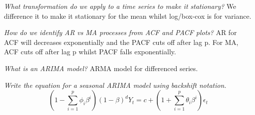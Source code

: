 \documentclass[11pt, oneside]{article}
\theoremstyle{definition}
\begin{document}
\textit{What transformation do we apply to a time series to make it stationary?} We difference it to make it stationary for the mean whilst log/box-cox is for variance.

\textit{How do we identify AR vs MA processes from ACF and PACF plots?} AR for ACF will decreases exponentially and the PACF cuts off after lag p. For MA, ACF cuts off after lag p whilst PACF falls exponentially.

\textit{What is an ARIMA model?} ARMA model for differenced series.

\textit{Write the equation for a seasonal ARIMA model using backshift notation.}
$$
(1 - \sum\limits_{i=1}^p\phi_i \beta^i)(1-\beta)^dY_t = c + (1 + \sum\limits_{i=1}^p\theta_i\beta^i)\epsilon_t
$$
\end{document}

